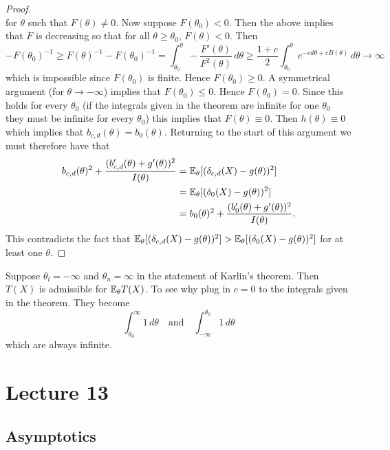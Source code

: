 \begin{proof}
\[	\] for $\theta$ such that $F(\theta) \neq 0$. Now suppose $F(\theta_0) < 0$. Then the above implies that $F$ is decreasing so that for all $\theta \ge \theta_0$, $F(\theta) < 0$. Then \[
		- F(\theta_0)^{-1}  \geq F(\theta)^{-1} - F(\theta_0)^{-1} = \int_{\theta_0}^{\theta} -\frac{F'(\theta)}{F^2(\theta)} \, d\theta \geq \frac{1+c}{2} \int_{\theta_0}^{\theta} e^{-cd\theta + cB(\theta)} \,d\theta \to \infty 
	\] which is impossible since $F(\theta_0)$ is finite. Hence $F(\theta_0) \geq 0$. A symmetrical argument (for $\theta \to -\infty$) implies that $F(\theta_0) \le 0$. Hence $F(\theta_0) = 0$. Since this holds for every $\theta_0$ (if the integrals given in the theorem are infinite for one $\theta_0$ they must be infinite for every $\theta_0$) this implies that $F(\theta) \equiv 0$. Then $h(\theta) \equiv 0$ which implies that $b_{c,d}(\theta) = b_0(\theta)$. Returning to the start of this argument we must therefore have that
	\begin{align*}
	b_{c,d}(\theta)^2
	+\frac{(b_{c,d}'(\theta)+g'(\theta))^2}{I(\theta)}
	&=\mathbb{E}_\theta[(\delta_{c,d}(X)-g(\theta))^2] \\
	&=\mathbb{E}_\theta[(\delta_0(X)-g(\theta))^2] \\
	&=b_0(\theta)^2
	+\frac{(b_0'(\theta)+g'(\theta))^2}{I(\theta)}.
	\end{align*}
	This contradicts the fact that $\mathbb{E}_\theta[(\delta_{c,d}(X) - g(\theta))^2] > \mathbb{E}_\theta[(\delta_{0}(X) - g(\theta))^2]$ for at least one $\theta$. 
\end{proof}

\begin{example}
	Suppose $\theta_l = -\infty$ and $\theta_u = \infty$ in the statement of Karlin's theorem. Then $T(X)$ is admissible for $\mathbb{E}_\theta T(X)$. To see why plug in $c = 0$ to the integrals given in the theorem. They become \[
		\int_{\theta_0}^\infty 1 \, d\theta \quad \text{and} \quad \int_{-\infty}^{\theta_0} 1 \, d\theta
	\] which are always infinite. 
\end{example}



\newpage
\section{Lecture 13}

\subsection{Asymptotics}

